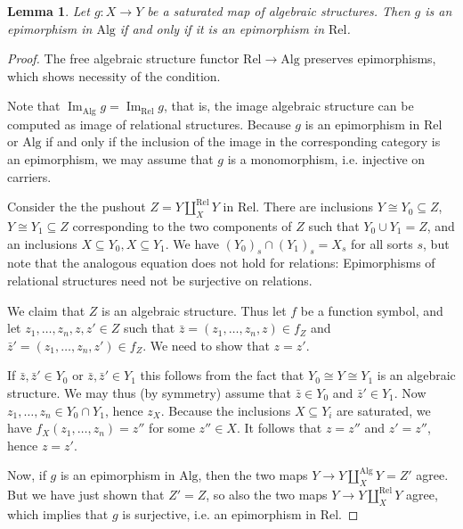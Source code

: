 \documentclass[a4paper]{article}
\newtheorem{lemma}[theorem]{Lemma}
\theoremstyle{remark}
\theoremstyle{definition}
\begin{document}
\begin{lemma}
  \label{lem:saturated-epis}
  Let $g : X \rightarrow Y$ be a saturated map of algebraic structures.
  Then $g$ is an epimorphism in $\mathrm{Alg}$ if and only if it is an epimorphism in $\mathrm{Rel}$.
\end{lemma}
\begin{proof}
  The free algebraic structure functor $\mathrm{Rel} \rightarrow \mathrm{Alg}$ preserves epimorphisms, which shows necessity of the condition.

  Note that $\operatorname{Im}_\mathrm{Alg} g = \operatorname{Im}_\mathrm{Rel} g$, that is, the image algebraic structure can be computed as image of relational structures.
  Because $g$ is an epimorphism in $\mathrm{Rel}$ or $\mathrm{Alg}$ if and only if the inclusion of the image in the corresponding category is an epimorphism, we may assume that $g$ is a monomorphism, i.e. injective on carriers.

  Consider the the pushout $Z = Y \amalg^\mathrm{Rel}_X Y$ in $\mathrm{Rel}$.
  There are inclusions $Y \cong Y_0 \subseteq Z$, $Y \cong Y_1 \subseteq Z$ corresponding to the two components of $Z$ such that $Y_0 \cup Y_1 = Z$, and an inclusions $X \subseteq Y_0, X \subseteq Y_1$.
  We have $(Y_0)_s \cap (Y_1)_s = X_s$ for all sorts $s$, but note that the analogous equation does not hold for relations:
  Epimorphisms of relational structures need not be surjective on relations.

  We claim that $Z$ is an algebraic structure.
  Thus let $f$ be a function symbol, and let $z_1, \dots, z_n, z, z' \in Z$ such that $\bar z = (z_1, \dots, z_n, z) \in f_Z$ and $\bar z' = (z_1, \dots, z_n, z') \in f_Z$.
  We need to show that $z = z'$.

  If $\bar z, \bar z' \in Y_0$ or $\bar z, \bar z' \in Y_1$ this follows from the fact that $Y_0 \cong Y \cong Y_1$ is an algebraic structure.
  We may thus (by symmetry) assume that $\bar z \in Y_0$ and $\bar z' \in Y_1$.
  Now $z_1, \dots, z_n \in Y_0 \cap Y_1$, hence $z_X$.
  Because the inclusions $X \subseteq Y_i$ are saturated, we have $f_X(z_1, \dots, z_n) = z''$ for some $z'' \in X$.
  It follows that $z = z''$ and $z' = z''$, hence $z = z'$.

  Now, if $g$ is an epimorphism in $\mathrm{Alg}$, then the two maps $Y \rightarrow Y \amalg^\mathrm{Alg}_X Y = Z'$ agree.
  But we have just shown that $Z' = Z$, so also the two maps $Y \rightarrow Y \amalg^\mathrm{Rel}_X Y$ agree, which implies that $g$ is surjective, i.e. an epimorphism in $\mathrm{Rel}$.
\end{proof}
\end{document}
